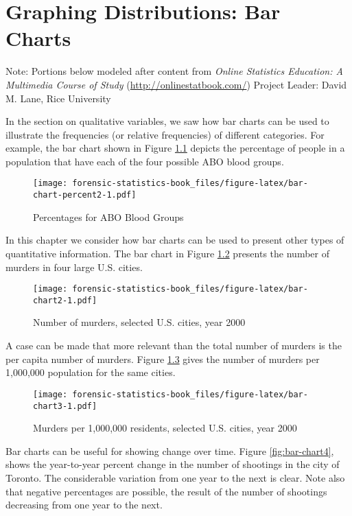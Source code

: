 \documentclass[
]{book}
\begin{document}
\hypertarget{graphing-distributions-bar-charts}{%
\chapter{Graphing Distributions: Bar Charts}\label{graphing-distributions-bar-charts}}

Note: Portions below modeled after content from
\emph{Online Statistics Education: A Multimedia Course of Study}
(\url{http://onlinestatbook.com/}) Project Leader: David M. Lane, Rice University

In the section on qualitative variables, we saw how bar charts can be used
to illustrate the frequencies (or relative frequencies) of different categories.
For example, the bar chart shown in Figure \ref{fig:bar-chart-percent2}
depicts the percentage of people in a population that have each of the four
possible ABO blood groups.

\begin{figure}
\centering
\texttt{[image: forensic-statistics-book\_files/figure-latex/bar-chart-percent2-1.pdf]}
\caption{\label{fig:bar-chart-percent2}Percentages for ABO Blood Groups}
\end{figure}

In this chapter we consider how bar charts can be used to present other
types of quantitative information. The bar chart in Figure \ref{fig:bar-chart2}
presents the number of murders in four large U.S. cities.

\begin{figure}
\centering
\texttt{[image: forensic-statistics-book\_files/figure-latex/bar-chart2-1.pdf]}
\caption{\label{fig:bar-chart2}Number of murders, selected U.S. cities, year 2000}
\end{figure}

A case can be made that more relevant than the total number of murders is
the per capita number of murders. Figure \ref{fig:bar-chart3} gives the
number of murders per 1,000,000 population for the same cities.

\begin{figure}
\centering
\texttt{[image: forensic-statistics-book\_files/figure-latex/bar-chart3-1.pdf]}
\caption{\label{fig:bar-chart3}Murders per 1,000,000 residents, selected U.S. cities, year 2000}
\end{figure}

Bar charts can be useful for showing change over time. Figure \ref{fig:bar-chart4},
shows the year-to-year percent change in the number of shootings in the city of
Toronto. The considerable variation from one year to the next is clear. Note also
that negative percentages are possible, the result of the number of shootings
decreasing from one year to the next.
\end{document}
